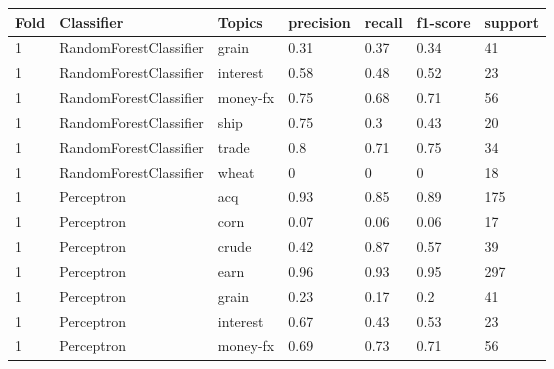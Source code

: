 \documentclass{article}
\begin{document}
\begin{table}[h]
\begin{tabular}{lllllll}
\textbf{Fold} & \textbf{Classifier}    & \textbf{Topics} & \textbf{precision} & \textbf{recall} & \textbf{f1-score} & \textbf{support} \\ \hline
1             & RandomForestClassifier & grain           & 0.31               & 0.37            & 0.34              & 41               \\
1             & RandomForestClassifier & interest        & 0.58               & 0.48            & 0.52              & 23               \\
1             & RandomForestClassifier & money-fx        & 0.75               & 0.68            & 0.71              & 56               \\
1             & RandomForestClassifier & ship            & 0.75               & 0.3             & 0.43              & 20               \\
1             & RandomForestClassifier & trade           & 0.8                & 0.71            & 0.75              & 34               \\
1             & RandomForestClassifier & wheat           & 0                  & 0               & 0                 & 18               \\
1             & Perceptron             & acq             & 0.93               & 0.85            & 0.89              & 175              \\
1             & Perceptron             & corn            & 0.07               & 0.06            & 0.06              & 17               \\
1             & Perceptron             & crude           & 0.42               & 0.87            & 0.57              & 39               \\
1             & Perceptron             & earn            & 0.96               & 0.93            & 0.95              & 297              \\
1             & Perceptron             & grain           & 0.23               & 0.17            & 0.2               & 41               \\
1             & Perceptron             & interest        & 0.67               & 0.43            & 0.53              & 23               \\
1             & Perceptron             & money-fx        & 0.69               & 0.73            & 0.71              & 56               \\

\end{tabular}
\end{table}
\end{document}
